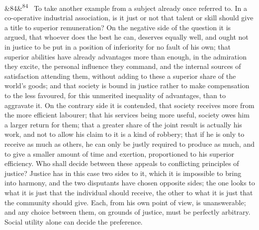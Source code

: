 \documentclass[12pt]{article}
\newcommand{\para}[1][]{\par\noindent\ifx&#1&\else\textsuperscript{\footnotesize #1}~\fi}
\begin{document}
\para[84] To take another example from a subject already once referred to. In a co-operative industrial association, is it just or not that talent or skill should give a title to superior remuneration? On the negative side of the question it is argued, that whoever does the best he can, deserves equally well, and ought not in justice to be put in a position of inferiority for no fault of his own; that superior abilities have already advantages more than enough, in the admiration they excite, the personal influence they command, and the internal sources of satisfaction attending them, without adding to these a superior share of the world's goods; and that society is bound in justice rather to make compensation to the less favoured, for this unmerited inequality of advantages, than to aggravate it. On the contrary side it is contended, that society receives more from the more efficient labourer; that his services being more useful, society owes him a larger return for them; that a greater share of the joint result is actually his work, and not to allow his claim to it is a kind of robbery; that if he is only to receive as much as others, he can only be justly required to produce as much, and to give a smaller amount of time and exertion, proportioned to his superior efficiency. Who shall decide between these appeals to conflicting principles of justice? Justice has in this case two sides to it, which it is impossible to bring into harmony, and the two disputants have chosen opposite sides; the one looks to what it is just that the individual should receive, the other to what it is just that the community should give. Each, from his own point of view, is unanswerable; and any choice between them, on grounds of justice, must be perfectly arbitrary. Social utility alone can decide the preference.
\end{document}
